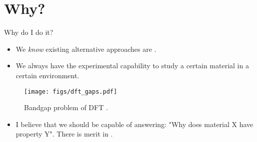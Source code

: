 \documentclass[12pt, pdf, hyperref={draft}, usenames, dvipsnames]{beamer}
\newcommand{\red}[1]{{\bf\color{LancsRed}{#1}}}
\newcommand{\blue}[1]{{\bf\color{NavyBlue}{#1}}}
\newcommand{\green}[1]{{\bf\color{ForestGreen}{#1}}}
\begin{document}
\section{Why?}
\begin{frame}{Why do I do it?}
\begin{minipage}{0.6\textwidth}
  \begin{itemize}
    \item We \textit{know} existing alternative approaches are \red{deficient}.
    \vspace{0.8cm}
    \item We \red{don't} always have the experimental capability to study a
    certain material in a certain environment.
  \end{itemize}
\end{minipage}%
\hfill
\begin{minipage}{0.4\textwidth}
\centering
  \begin{figure}[H]
    \centering
    \texttt{[image: figs/dft\_gaps.pdf]}
    \caption{Bandgap problem of DFT \blue{(and $GW$..?)}\footnotemark.}
    \label{fig:dft_gaps}
  \end{figure}
\end{minipage}
\vspace{0.1cm}
  \begin{itemize}
    \item I believe that we should be capable of answering:  "Why does material
    X have property Y". There is merit in \green{knowing}.
  \end{itemize}
\end{frame}


\end{document}
